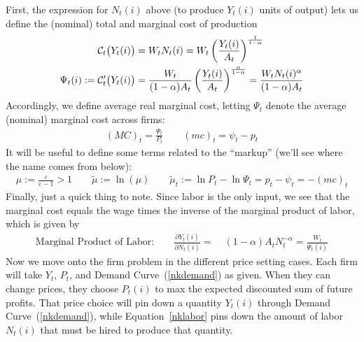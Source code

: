 \documentclass[12pt]{article}
\theoremstyle{plain}
\theoremstyle{definition}
\theoremstyle{remark}
\newcommand{\calC}{\mathcal{C}}
\begin{document}
First, the expression for $N_t(i)$ above (to produce $Y_t(i)$ units of
output) lets us define the (nominal) total and marginal cost of
production
\begin{align}
  \calC_t\big(Y_t(i)\big) &=
  W_t
  N_t(i)=
  W_t
  \left(\frac{Y_t(i)}{A_t}\right)^{\frac{1}{1-\alpha}}
  \label{nkcost}
  \\
  \Psi_t(i) :=
  \calC'_t\big(Y_t(i)\big) &=
  \frac{W_t}{(1-\alpha)A_t}
  \left(\frac{Y_t(i)}{A_t}\right)^{\frac{\alpha}{1-\alpha}}
  =
  \frac{W_tN_t(i)^{\alpha}}{(1-\alpha)A_t}
  \notag
\end{align}
Accordingly, we define average real marginal cost, letting $\Psi_t$
denote the average (nominal) marginal cost across firms:
\begin{align*}
  (MC)_t
  =
  \frac{\Psi_t}{P_t}
  \qquad
  (mc)_t = \psi_t - p_t
\end{align*}
It will be useful to define some terms related to the ``markup'' (we'll
see where the name comes from below):
\begin{align*}
  \mu := \frac{\varepsilon}{\varepsilon-1} > 1
  \qquad
  \tilde{\mu} := \ln(\mu)
  \qquad
  \tilde{\mu}_t
  := \ln P_t - \ln\Psi_t
  = p_t - \psi_t
  = -(mc)_t
\end{align*}
Finally, just a quick thing to note.
Since labor is the only input, we see that the marginal cost equals the
wage times the inverse of the marginal product of labor, which is given
by
\begin{align*}
  \text{Marginal Product of Labor:}\quad\quad
  \frac{\partial Y_t(i)}{\partial N_t(i)}
  =&\;
  (1-\alpha) A_tN_t^{-\alpha}
  = \frac{W_t}{\Psi_t(i)}
\end{align*}
Now we move onto the firm problem in the different price setting cases.
Each firm will take $Y_t$, $P_t$, and Demand Curve~(\ref{nkdemand}) as
given. When they can change prices, they choose $P_t(i)$ to max the
expected discounted sum of future profits. That price choice will pin
down a quantity $Y_t(i)$ through Demand Curve~(\ref{nkdemand}), while
Equation~\ref{nklabor} pins down the amount of labor $N_t(i)$ that must
be hired to produce that quantity.
\end{document}
